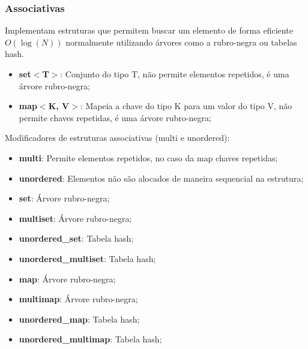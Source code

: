 \documentclass[12pt]{beamer}
\begin{document}
\begin{frame}[allowframebreaks]
    \frametitle{Associativas}

    Implementam estruturas que permitem buscar um elemento de forma eficiente $O(\log(N))$ normalmente utilizando árvores como a rubro-negra ou tabelas hash.
    \begin{itemize}
        \item\textbf{set$<$T$>$}: Conjunto do tipo T, não permite elementos repetidos, é uma árvore rubro-negra;
        \item\textbf{map$<$K, V$>$}: Mapeia a chave do tipo K para um valor do tipo V, não permite chaves repetidas, é uma árvore rubro-negra;
    \end{itemize}

    \framebreak
    Modificadores de estruturas associativas (multi e unordered):
    \begin{itemize}
        \item\textbf{multi}: Permite elementos repetidos, no caso da map chaves repetidas;
        \item\textbf{unordered}: Elementos não são alocados de maneira sequencial na estrutura;
    \end{itemize}

    \framebreak
    \begin{itemize}
        \item\textbf{set}: Árvore rubro-negra;
        \item\textbf{multiset}: Árvore rubro-negra;
        \item\textbf{unordered\_set}: Tabela hash;
        \item\textbf{unordered\_multiset}: Tabela hash;

        \item\textbf{map}: Árvore rubro-negra;
        \item\textbf{multimap}: Árvore rubro-negra;
        \item\textbf{unordered\_map}: Tabela hash;
        \item\textbf{unordered\_multimap}: Tabela hash;
    \end{itemize}

\end{frame}
\end{document}
